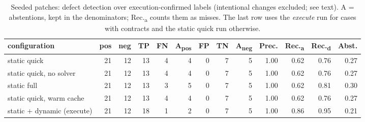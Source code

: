 \begin{table}[t]
\centering
\small

\caption{Seeded patches: defect detection over execution-confirmed labels (intentional changes excluded; see text). A = abstentions, kept in the denominators; Rec.\textsubscript{a} counts them as misses. The last row uses the \emph{execute} run for cases with contracts and the static quick run otherwise.}
\label{tab:seeded-confusion}
\begin{tabular}{lrrrrrrrrrrrr}
\toprule
configuration & pos & neg & TP & FN & A\textsubscript{pos} & FP & TN & A\textsubscript{neg} & Prec. & Rec.\textsubscript{a} & Rec.\textsubscript{d} & Abst. \\
\midrule
static quick & 21 & 12 & 13 & 4 & 4 & 0 & 7 & 5 & 1.00 & 0.62 & 0.76 & 0.27 \\
static quick, no solver & 21 & 12 & 13 & 4 & 4 & 0 & 7 & 5 & 1.00 & 0.62 & 0.76 & 0.27 \\
static full & 21 & 12 & 13 & 3 & 5 & 0 & 7 & 5 & 1.00 & 0.62 & 0.81 & 0.30 \\
static quick, warm cache & 21 & 12 & 13 & 4 & 4 & 0 & 7 & 5 & 1.00 & 0.62 & 0.76 & 0.27 \\
\midrule
static + dynamic (execute) & 21 & 12 & 18 & 1 & 2 & 0 & 7 & 5 & 1.00 & 0.86 & 0.95 & 0.21 \\
\bottomrule
\end{tabular}
\end{table}
